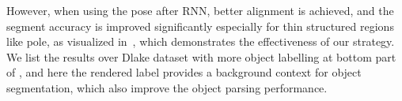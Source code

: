 However, when using the pose after RNN, better alignment is achieved, and the segment accuracy is improved significantly especially for thin structured regions like pole, as visualized in~, which demonstrates the effectiveness of our strategy. We list the results over Dlake dataset with more object labelling at bottom part of , and here the rendered label provides a background context for object segmentation, which also improve the object parsing performance. 

